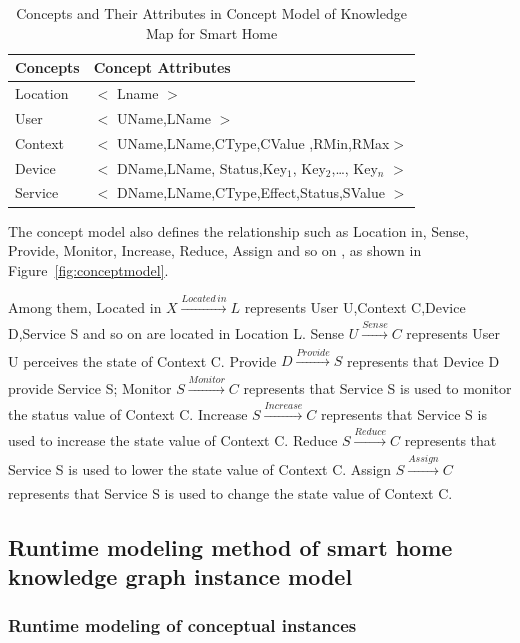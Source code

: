 \begin{table}[htbp]
	\caption{Concepts and Their Attributes in Concept Model of Knowledge Map for Smart Home}
	\centering  %
	\label{table4}  %
	\renewcommand\arraystretch{1.5}  %
	\begin{tabular}{|p{2cm}<{\centering}|p{8cm}|}  %
		\hline
		Concepts & Concept Attributes \\
		\hline
		Location & $<$ Lname $>$ \\
		\hline		
		User     & $<$ UName,LName $>$\\
		\hline		
		Context  & $<$ UName,LName,CType,CValue ,{RMin,RMax}$>$\\
		\hline		
		Device   & $<$ DName,LName, Status,{Key$_{1}$, Key$_{2}$,…, Key$_{n}$} $>$\\
		\hline		
		Service  & $<$ DName,LName,CType,Effect,Status,SValue $>$\\
		\hline	
	\end{tabular}
\end{table}
The concept model also defines the relationship such as Location in, Sense, Provide, Monitor, Increase, Reduce, Assign and so on , as shown in Figure~\ref{fig:conceptmodel}.

Among them, Located in  $X\xrightarrow[]{Located\,in}L$  represents User U,Context C,Device D,Service S and so on are located in Location L. Sense $U\xrightarrow[]{Sense}C$ represents User U perceives the state of Context C. Provide $D\xrightarrow[]{Provide}S$ represents that Device D provide Service S; Monitor $S\xrightarrow[]{Monitor}C$ represents that Service S is used to monitor the status value of Context C. Increase $S\xrightarrow[]{Increase}C$ represents that Service S is used to increase the state value of Context C. Reduce $S\xrightarrow[]{Reduce}C$ represents that Service S is used to lower the state value of Context C. Assign $S\xrightarrow[]{Assign}C$ represents that Service S is used to change the state value of Context C.

\subsection{Runtime modeling method of smart home knowledge graph instance model}

\subsubsection{Runtime modeling of conceptual instances}

